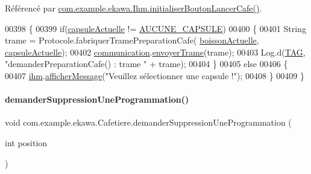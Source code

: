 Référencé par \hyperlink{_ihm_8java_source_l00526}{com.\+example.\+ekawa.\+Ihm.\+initialiser\+Bouton\+Lancer\+Cafe()}.


\begin{DoxyCode}
00398     \{
00399         \textcolor{keywordflow}{if}(\hyperlink{classcom_1_1example_1_1ekawa_1_1_cafetiere_ac8fa3d1ad76eccf431ee04b395a557a3}{capsuleActuelle} != \hyperlink{classcom_1_1example_1_1ekawa_1_1_cafetiere_a5a23a636fa5f2e5826458e700f453c16}{AUCUNE\_CAPSULE})
00400         \{
00401             String trame = Protocole.fabriquerTramePreparationCafe(
      \hyperlink{classcom_1_1example_1_1ekawa_1_1_cafetiere_a73c5fa3b510655e1e3425140336b7f5b}{boissonActuelle}, \hyperlink{classcom_1_1example_1_1ekawa_1_1_cafetiere_ac8fa3d1ad76eccf431ee04b395a557a3}{capsuleActuelle});
00402             \hyperlink{classcom_1_1example_1_1ekawa_1_1_cafetiere_af9506a7805d000d2cb83444cdb8ea889}{communication}.\hyperlink{classcom_1_1example_1_1ekawa_1_1_communication_a98808d0236e547b9a3ee485f66aa7af0}{envoyerTrame}(trame);
00403             Log.d(\hyperlink{classcom_1_1example_1_1ekawa_1_1_cafetiere_aa0c1fd99a2508b06c462aea17034aa91}{TAG}, \textcolor{stringliteral}{"demanderPreparationCafe() : trame "} + trame);
00404         \}
00405         \textcolor{keywordflow}{else}
00406         \{
00407             \hyperlink{classcom_1_1example_1_1ekawa_1_1_cafetiere_a7db4a63088834eda5f6a3e951611bf82}{ihm}.\hyperlink{classcom_1_1example_1_1ekawa_1_1_ihm_ab1ca33ad18d42540299e3a58a82f4d9a}{afficherMessage}(\textcolor{stringliteral}{"Veuillez sélectionner une capsule !"});
00408         \}
00409     \}
\end{DoxyCode}
\mbox{\label{classcom_1_1example_1_1ekawa_1_1_cafetiere_a0af9bf8f80c745c7919ea3efdc2183d0}} 
\paragraph{\texorpdfstring{demander\+Suppression\+Une\+Programmation()}{demanderSuppressionUneProgrammation()}}
{\footnotesize\ttfamily void com.\+example.\+ekawa.\+Cafetiere.\+demander\+Suppression\+Une\+Programmation (\begin{DoxyParamCaption}\item[{int}]{position }\end{DoxyParamCaption})}



